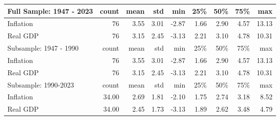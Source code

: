 \begin{tabular}{lrrrrrrrr}
\toprule
Full Sample: 1947 - 2023 & count & mean & std & min & 25\% & 50\% & 75\% & max \\
\midrule
Inflation & 76 & 3.55 & 3.01 & -2.87 & 1.66 & 2.90 & 4.57 & 13.13 \\
Real GDP & 76 & 3.15 & 2.45 & -3.13 & 2.21 & 3.10 & 4.78 & 10.31 \\
\midrule
Subsample: 1947 - 1990 & count & mean & std & min & 25\% & 50\% & 75\% & max \\
\midrule
Inflation & 76 & 3.55 & 3.01 & -2.87 & 1.66 & 2.90 & 4.57 & 13.13 \\
Real GDP & 76 & 3.15 & 2.45 & -3.13 & 2.21 & 3.10 & 4.78 & 10.31 \\
\midrule
Subsample: 1990-2023 & count & mean & std & min & 25\% & 50\% & 75\% & max \\
\midrule
Inflation & 34.00 & 2.69 & 1.81 & -2.10 & 1.75 & 2.74 & 3.18 & 8.52 \\
Real GDP & 34.00 & 2.45 & 1.73 & -3.13 & 1.89 & 2.62 & 3.48 & 4.79 \\
\bottomrule
\end{tabular}
